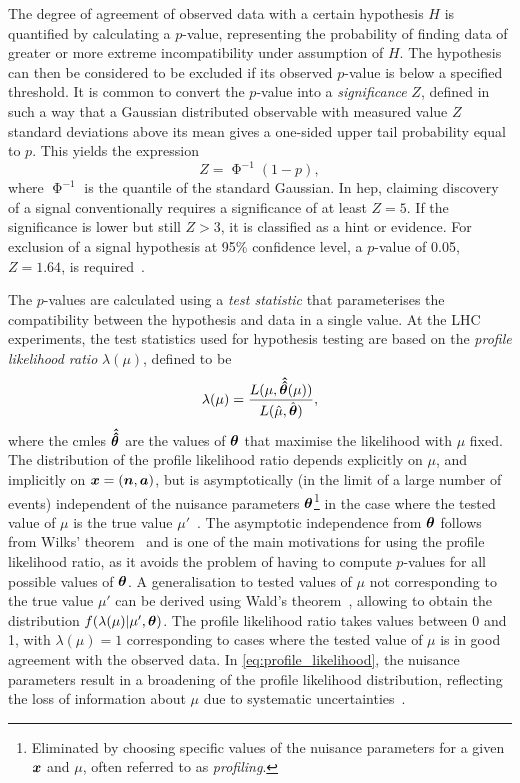 The degree of agreement of observed data with a certain hypothesis $H$ is quantified by calculating a $p$-value, representing the probability of finding data of greater or more extreme incompatibility under assumption of $H$. The hypothesis can then be considered to be excluded if its observed $p$-value is below a specified threshold. It is common to convert the $p$-value into a \textit{significance} $Z$, defined in such a way that a Gaussian distributed observable with measured value $Z$ standard deviations above its mean gives a one-sided upper tail probability equal to $p$. This yields the expression
\begin{equation}
	Z = \upPhi^{-1}(1-p),
	\label{eq:significance}
\end{equation}
where $\upPhi^{-1}$ is the quantile of the standard Gaussian. In \gls{hep}, claiming discovery of a signal conventionally requires a significance of at least $Z=5$. If the significance is lower but still $Z>3$, it is classified as a hint or evidence. For exclusion of a signal hypothesis at 95\% confidence level, a $p$-value of 0.05, \ie $Z = 1.64$, is required~\cite{Cowan:2010js}. 

The $p$-values are calculated using a \textit{test statistic} that parameterises the compatibility between the hypothesis and data in a single value. At the LHC experiments, the test statistics used for hypothesis testing are based on the \textit{profile likelihood ratio} $\lambda(\mu)$, defined to be
\begin{equation}
	\lambda(\mu) = \frac{L(\mu,\makemebold{\hat{\hat{\theta}}}(\mu))}{L(\hat{\mu},\hat{\makemebold{\theta}})},
	\label{eq:profile_likelihood}
\end{equation}
where the \glspl{cmle} $\makemebold{\hat{\hat{\theta}}}$ are the values of $\makemebold{\theta}$ that maximise the likelihood with $\mu$ fixed. The distribution of the profile likelihood ratio depends explicitly on $\mu$, and implicitly on $\makemebold{x} = (\makemebold{n},\makemebold{a})$, but is asymptotically  (\ie in the limit of a large number of events) independent of the nuisance parameters $\makemebold{\theta}$\footnote{Eliminated by choosing specific values of the nuisance parameters for a given $\makemebold{x}$ and $\mu$, often referred to as \textit{profiling}.} in the case where the tested value of $\mu$ is the true value $\mu'$~\cite{Cranmer:2015nia}. The asymptotic independence from $\makemebold{\theta}$ follows from Wilks' theorem~\cite{wilks1938} and is one of the main motivations for using the profile likelihood ratio, as it avoids the problem of having to compute $p$-values for all possible values of $\makemebold{\theta}$. A generalisation to tested values of $\mu$ not corresponding to the true value $\mu'$ can be derived using Wald's theorem~\cite{wald10.2307/1990256}, allowing to obtain the distribution $f(\lambda(\mu)\vert \mu',\makemebold{\theta})$. The profile likelihood ratio takes values between 0 and 1, with $\lambda(\mu) = 1$ corresponding to cases where the tested value of $\mu$ is in good agreement with the observed data. In \cref{eq:profile_likelihood}, the nuisance parameters result in a broadening of the profile likelihood distribution, reflecting the loss of information about $\mu$ due to systematic uncertainties~\cite{Cowan:2010js}.

